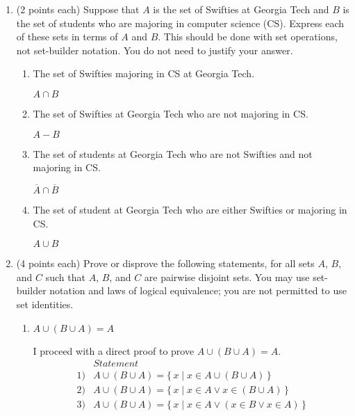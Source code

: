 \documentclass[11pt]{article}
\newcommand{\pte}[1]{\textcolor{maincolor}{(#1 points each)}}
\begin{document}
\begin{justify}
\begin{enumerate}
\begin{enumerate}
\end{enumerate}
\item \pte{2} Suppose that $A$ is the set of Swifties at Georgia Tech and $B$
is the set of students who are majoring in computer science (CS). Express each of
these sets in terms of $A$ and $B$. This should be done with set operations, not
set-builder notation. You do not need to justify your answer.
\begin{enumerate}
\item The set of Swifties majoring in CS at Georgia Tech.
\begin{mdframed}
    $A \cap B$
\end{mdframed}
\item The set of Swifties at Georgia Tech who are not majoring in CS.
\begin{mdframed}
    $A - B$
\end{mdframed}
\item The set of students at Georgia Tech who are not Swifties and not
majoring in CS.
\begin{mdframed}
    $\overline{A} \cap \overline{B}$
\end{mdframed}
\item The set of student at Georgia Tech who are either Swifties or
majoring in CS.
\begin{mdframed}
    $A \cup B$ 
\end{mdframed}
\end{enumerate}
\item \pte{4} Prove or disprove the following statements, for all sets $A$,
$B$, and $C$ such that $A$, $B$, and $C$ are pairwise disjoint sets. You may use
set-builder notation and laws of logical equivalence; you are not permitted to use
set identities.
\begin{enumerate}
\item $A \cup (B \cup A) = A$
\begin{mdframed}
    I proceed with a direct proof to prove $A \cup (B \cup A) = A$.
    \begin{align*}
        &Statement \tag{Reason} \\
        1) &A \cup (B \cup A) = \{\, x \mid x \in A \cup (B \cup A) \,\} \tag{1. given} \\
        2) &A \cup (B \cup A) = \{\, x \mid x \in A \lor x \in (B \cup A) \,\} \tag{2. defintion of union} \\
        3) &A \cup (B \cup A) = \{\, x \mid x \in A \lor (x \in B \lor x \in A) \,\} \tag{3. definition of union} \\

\end{align*}
\end{mdframed}
\end{enumerate}
\end{enumerate}
\end{justify}
\end{document}

